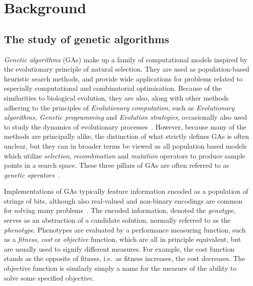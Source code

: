 \documentclass[a4paper,12pt]{article}
\theoremstyle{plain}
\theoremstyle{definition}
\begin{document}
\section{Background}
   \subsection{The study of genetic algorithms}
      \textit{Genetic algorithms} (GAs) make up a family of computational models inspired
      by the evolutionary principle of natural selection. They are used as population-based 
      heuristic search methods, and provide wide 
      applications for problems related to especially computational and
      combinatorial optimisation. 
      Because of the similarities to biological evolution, they are also, along with
      other methods adhering to the principles of \textit{Evolutionary
      computation}, such as \textit{Evolutionary algorithms, Genetic
      programming} and \textit{Evolution strategies}, occasionally also used to study 
      the dynamics of evolutionary processes~\cite{sudoku}. However, because
      many of the methods are principally alike, the
      distinction of what strictly defines GAs is often unclear, but they can in
      broader terms be viewed as all 
      population based models which utilize \textit{selection}, \textit{recombination} and \textit{mutation}
      operators to produce sample points in a search space. These three pillars of GAs are often referred to
      as \textit{genetic operators}~\cite{tutorial}.

      Implementations of GAs typically feature information encoded
      as a population of strings of bits, although also real-valued and
      non-binary encodings are common for solving many
      problems~\cite{virtual_alphabets,real_coded_goldberg}. 
      The encoded information, denoted the \textit{genotype}, serves as an
      abstraction of a candidate solution, normally referred to as the
      \textit{phenotype}. Phenotypes are evaluated by a performance
      measuring function, such as a \textit{fitness}, \textit{cost} or
      \textit{objective} function, which are all in principle equivalent, but are usually used to
      signify different measures. For example, the cost function stands as the
      opposite of fitness, i.e.\ as fitness increases, the cost decreases. The
      objective function is similarly simply a name for the measure of the
      ability to solve some specified objective. 
      
\end{document}
